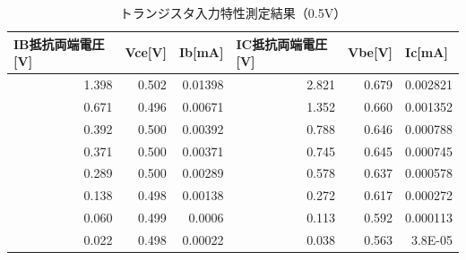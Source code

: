 \documentclass[titlepage]{jarticle}
\begin{document}
\begin{table}[htbp]
    \caption{トランジスタ入力特性測定結果（0.5V）}
    \begin{center}
        \begin{tabular}{r|r|r|r|r|r}
            \hline\hline
            \multicolumn{1}{l|}{IB抵抗両端電圧[V]} & \multicolumn{1}{l|}{Vce[V]} & \multicolumn{1}{l|}{Ib[mA]} & \multicolumn{1}{l|}{IC抵抗両端電圧[V]} & \multicolumn{1}{l|}{Vbe[V]} & \multicolumn{1}{l}{Ic[mA]} \\ \hline
            1.398                                  & 0.502                       & 0.01398                     & 2.821                                  & 0.679                       & 0.002821                   \\ \hline
            0.671                                  & 0.496                       & 0.00671                     & 1.352                                  & 0.660                       & 0.001352                   \\ \hline
            0.392                                  & 0.500                       & 0.00392                     & 0.788                                  & 0.646                       & 0.000788                   \\ \hline
            0.371                                  & 0.500                       & 0.00371                     & 0.745                                  & 0.645                       & 0.000745                   \\ \hline
            0.289                                  & 0.500                       & 0.00289                     & 0.578                                  & 0.637                       & 0.000578                   \\ \hline
            0.138                                  & 0.498                       & 0.00138                     & 0.272                                  & 0.617                       & 0.000272                   \\ \hline
            0.060                                  & 0.499                       & 0.0006                      & 0.113                                  & 0.592                       & 0.000113                   \\ \hline
            0.022                                  & 0.498                       & 0.00022                     & 0.038                                  & 0.563                       & 3.8E-05                    \\ \hline

\end{tabular}
\end{center}
\end{table}
\end{document}
